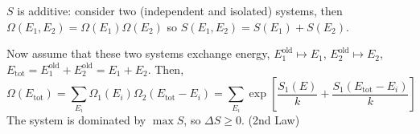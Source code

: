 \documentclass{article}
\theoremstyle{definition}
\theoremstyle{remark}
\theoremstyle{plain}
\begin{document}
$S$ is additive: consider two (independent and isolated) systems, then $\Omega(E_1,E_2)=\Omega(E_1)\Omega(E_2)$ so $S(E_1,E_2)=S(E_1)+S(E_2)$.

Now assume that these two systems exchange energy, $E^{\text{old}}_1\mapsto E_1$, $E_2^{\text{old}}\mapsto E_2$, $E_{\text{tot}}=E_1^{\text{old}}+E_2^{\text{old}}=E_1+E_2$. Then,
\[\Omega(E_{\text{tot}})=\sum_{E_i}\Omega_1(E_i)\Omega_2(E_{\text{tot}}-E_i)=\sum_{E_i}\exp\left[\dfrac{S_1(E)}{k}+\dfrac{S_1(E_{\text{tot}}-E_i)}{k}\right]\]
The system is dominated by $\max S$, so $\Delta S\ge 0$. (2nd Law)
\end{document}
